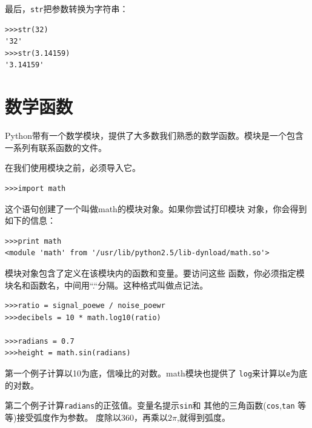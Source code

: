 最后，{\tt str}把参数转换为字符串：


\beforeverb
\begin{verbatim}
>>>str(32)
'32'
>>>str(3.14159)
'3.14159'
\end{verbatim}
\afterverb




\section{数学函数}

Python带有一个数学模块，提供了大多数我们熟悉的数学函数。模块是一个包含一系列有联系函数的文件。


在我们使用模块之前，必须导入它。

\beforeverb
\begin{verbatim}
>>>import math
\end{verbatim}
\afterverb

这个语句创建了一个叫做math的模块对象。如果你尝试打印模块
对象，你会得到如下的信息：

\beforeverb
\begin{verbatim}
>>>print math
<module 'math' from '/usr/lib/python2.5/lib-dynload/math.so'>
\end{verbatim}
\afterverb

模块对象包含了定义在该模块内的函数和变量。要访问这些
函数，你必须指定模块名和函数名，中间用“.“分隔。这种格式叫做点记法。


\beforeverb
\begin{verbatim}
>>>ratio = signal_poewe / noise_poewr
>>>decibels = 10 * math.log10(ratio)

>>>radians = 0.7
>>>height = math.sin(radians)
\end{verbatim}
\afterverb

第一个例子计算以10为底，信噪比的对数。math模块也提供了
{\tt log}来计算以{\tt e}为底的对数。


第二个例子计算{\tt radians}的正弦值。变量名提示{\tt sin}和
其他的三角函数({\tt cos},{\tt tan} 等等)接受弧度作为参数。
度除以360，再乘以$2\pi$,就得到弧度。

